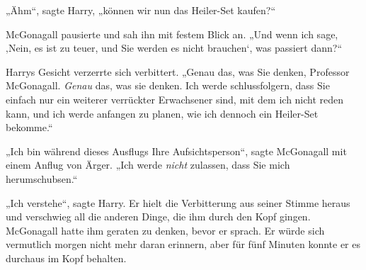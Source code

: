 „Ähm“, sagte Harry, „können wir nun das Heiler-Set kaufen?“

McGonagall pausierte und sah ihn mit festem Blick an. „Und wenn ich sage, ‚Nein, es ist zu teuer, und Sie werden es nicht brauchen‘, was passiert dann?“

Harrys Gesicht verzerrte sich verbittert. „Genau das, was Sie denken, Professor McGonagall. \emph{Genau} das, was sie denken. Ich werde schlussfolgern, dass Sie einfach nur ein weiterer verrückter Erwachsener sind, mit dem ich nicht reden kann, und ich werde anfangen zu planen, wie ich dennoch ein Heiler-Set bekomme.“

„Ich bin während dieses Ausflugs Ihre Aufsichtsperson“, sagte McGonagall mit einem Anflug von Ärger. „Ich werde \emph{nicht} zulassen, dass Sie mich herumschubsen.“

„Ich verstehe“, sagte Harry. Er hielt die Verbitterung aus seiner Stimme heraus und verschwieg all die anderen Dinge, die ihm durch den Kopf gingen. McGonagall hatte ihm geraten zu denken, bevor er sprach. Er würde sich vermutlich morgen nicht mehr daran erinnern, aber für fünf Minuten konnte er es durchaus im Kopf behalten.

